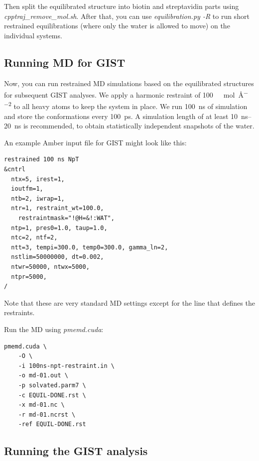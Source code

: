 \documentclass[9pt,tutorial]{livecoms}
\newcommand{\software}{\emph}
\begin{document}
Then split the equilibrated structure into biotin and streptavidin parts using \software{cpptraj\_remove\_mol.sh}.
After that, you can use \software{equilibration.py -R} to run short restrained equilibrations (where only the water is allowed to move) on the individual systems.

\subsection{Running MD for GIST}

Now, you can run restrained MD simulations based on the equilibrated structures for subsequent GIST analyses.
We apply a harmonic restraint of \SI{100}{\kilo\calorie\per\mole\per\angstrom\squared} to all heavy atoms to keep the system in place.
We run \SI{100}{\nano\second} of simulation and store the conformations every \SI{100}{\pico\second}.
A simulation length of at least \SIrange{10}{20}{\nano\second} is recommended, to obtain statistically independent snapshots of the water.

An example Amber input file for GIST might look like this:
\begin{lstlisting}
restrained 100 ns NpT
&cntrl
  ntx=5, irest=1,
  ioutfm=1,
  ntb=2, iwrap=1,
  ntr=1, restraint_wt=100.0,
    restraintmask="!@H=&!:WAT",
  ntp=1, pres0=1.0, taup=1.0,
  ntc=2, ntf=2,
  ntt=3, tempi=300.0, temp0=300.0, gamma_ln=2,
  nstlim=50000000, dt=0.002,
  ntwr=50000, ntwx=5000,
  ntpr=5000,
/
\end{lstlisting}
Note that these are very standard MD settings except for the line that defines the restraints.

Run the MD using \software{pmemd.cuda}:
\begin{lstlisting}
pmemd.cuda \
	-O \
	-i 100ns-npt-restraint.in \
	-o md-01.out \
	-p solvated.parm7 \
	-c EQUIL-DONE.rst \
	-x md-01.nc \
	-r md-01.ncrst \
	-ref EQUIL-DONE.rst
\end{lstlisting}
\subsection{Running the GIST analysis}
\end{document}
